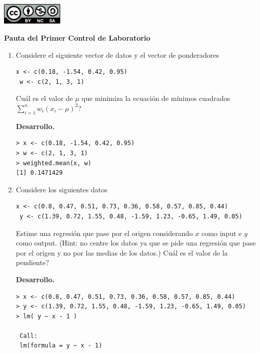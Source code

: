 \documentclass[11pt,oneside,spanish]{article}
\theoremstyle{definition}
\theoremstyle{definition}\newtheorem{definicion}{Definicin}
\theoremstyle{definition}\newtheorem{ejemplo}{Ejemplo}
\theoremstyle{remark}\newtheorem{nota}{\textsc{Nota}}
\theoremstyle{definition}\newtheorem{proposicion}{Proposicin}
\theoremstyle{definition}\newtheorem{problema}{Problema}
\begin{document}
\thispagestyle{fancy}

\includegraphics[width=8em]{by-nc-sa.pdf}

\begin{center}
\textbf{Pauta del Primer Control de Laboratorio} 
\end{center}

\bigskip

\begin{enumerate}[(1)]
\item Considere el siguiente vector de datos y el vector de ponderadores
\begin{lstlisting}[backgroundcolor=\color{Gray!20},frame=none,basicstyle=\ttfamily]
 x <- c(0.18, -1.54, 0.42, 0.95)
 w <- c(2, 1, 3, 1)
\end{lstlisting}
{\textquestiondown}Cu\'al es el valor de $\mu$ que minimiza la ecuaci\'on de m\'inimos cuadrados $\sum_{i=1}^n w_i(x_i-\mu)^2$?

\textbf{Desarrollo.}
\begin{lstlisting}[backgroundcolor=\color{Gray!20},frame=none,basicstyle=\ttfamily]
> x <- c(0.18, -1.54, 0.42, 0.95)
> w <- c(2, 1, 3, 1)
> weighted.mean(x, w)
[1] 0.1471429\end{lstlisting}
	
\item Considere los siguientes datos
\begin{lstlisting}[backgroundcolor=\color{Gray!20},frame=none,basicstyle=\ttfamily]
 x <- c(0.8, 0.47, 0.51, 0.73, 0.36, 0.58, 0.57, 0.85, 0.44)
 y <- c(1.39, 0.72, 1.55, 0.48, -1.59, 1.23, -0.65, 1.49, 0.05)
\end{lstlisting}
Estime una regresi\'on que pase por el origen considerando $x$ como input e $y$ como output. (Hint: no centre los datos ya que se pide una regresi\'on 	que pase por el origen y no por las medias de los datos.)
{\textquestiondown}Cu\'al es el valor de la pendiente?

\textbf{Desarrollo.}
\begin{lstlisting}[backgroundcolor=\color{Gray!20},frame=none,basicstyle=\ttfamily]
> x <- c(0.8, 0.47, 0.51, 0.73, 0.36, 0.58, 0.57, 0.85, 0.44)
> y <- c(1.39, 0.72, 1.55, 0.48, -1.59, 1.23, -0.65, 1.49, 0.05)
> lm( y ~ x - 1 )

 Call:
 lm(formula = y ~ x - 1)


\end{lstlisting}
\end{enumerate}
\end{document}
